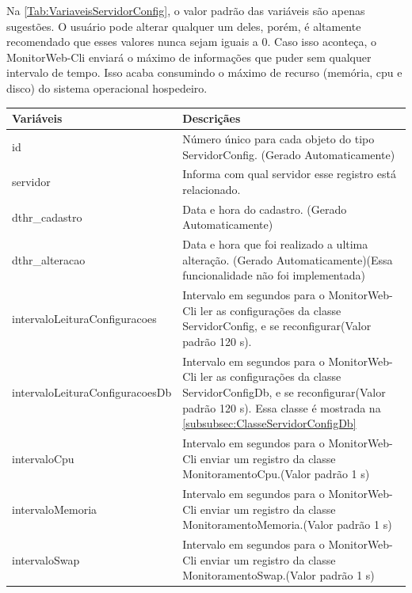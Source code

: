 Na \autoref{Tab:VariaveisServidorConfig}, o valor padrão das variáveis são apenas sugestões. O usuário pode alterar qualquer um deles, porém, é altamente recomendado que esses valores nunca sejam iguais a 0. Caso isso aconteça, o MonitorWeb-Cli enviará o máximo de informações que puder sem qualquer intervalo de tempo. Isso acaba consumindo o máximo de recurso (memória, cpu e disco) do sistema operacional hospedeiro.

\begin{table}[H]
\centering
\begin{tabular}{|l|l|}
\hline
{\color[HTML]{000000} \textbf{Variáveis}} & {\color[HTML]{000000} \textbf{Descriçães}} \\ \hline
id                                     & \multicolumn{1}{p{10.00cm}|}{Número único para cada objeto do tipo ServidorConfig. (Gerado Automaticamente)} \\ \hline
servidor                               & \multicolumn{1}{p{10.00cm}|}{Informa com qual servidor esse registro está relacionado.}
\\ \hline
dthr\_cadastro                         & \multicolumn{1}{p{10.00cm}|}{Data e hora do cadastro. (Gerado Automaticamente)}\\ \hline
dthr\_alteracao                        & \multicolumn{1}{p{10.00cm}|}{Data e hora que foi realizado a ultima alteração. (Gerado Automaticamente)(Essa funcionalidade não foi implementada)}\\ \hline
intervaloLeituraConfiguracoes          & \multicolumn{1}{p{10.00cm}|}{Intervalo em segundos para o MonitorWeb-Cli ler as configurações da classe ServidorConfig, e se reconfigurar(Valor padrão 120 s).} \\ \hline
intervaloLeituraConfiguracoesDb        & \multicolumn{1}{p{10.00cm}|}{Intervalo em segundos para o  MonitorWeb-Cli ler as configurações da classe ServidorConfigDb, e se reconfigurar(Valor padrão 120 s). Essa classe é mostrada na \autoref{subsubsec:ClasseServidorConfigDb}} \\ \hline
intervaloCpu                           & \multicolumn{1}{p{10.00cm}|}{Intervalo em segundos para o MonitorWeb-Cli enviar um registro da classe MonitoramentoCpu.(Valor padrão 1 s)}\\ \hline
intervaloMemoria                       & \multicolumn{1}{p{10.00cm}|}{Intervalo em segundos para o MonitorWeb-Cli enviar um registro da classe MonitoramentoMemoria.(Valor padrão 1 s)}\\ \hline
intervaloSwap                          & \multicolumn{1}{p{10.00cm}|}{Intervalo em segundos para o MonitorWeb-Cli enviar um registro da classe MonitoramentoSwap.(Valor padrão 1 s)} \\ \hline

\end{tabular}
\end{table}
